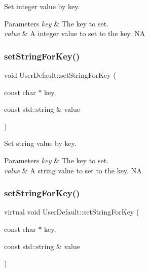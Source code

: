 Set integer value by key. 
\begin{DoxyParams}{Parameters}
{\em key} & The key to set. \\
\hline
{\em value} & A integer value to set to the key.  NA \\
\hline
\end{DoxyParams}
\mbox{\label{classUserDefault_ab2024c825a63e8c78f49b0b2f5b66f37}} 
\subsubsection{\texorpdfstring{set\+String\+For\+Key()}{setStringForKey()}\hspace{0.1cm}{\footnotesize\ttfamily [1/2]}}
{\footnotesize\ttfamily void User\+Default\+::set\+String\+For\+Key (\begin{DoxyParamCaption}\item[{const char $\ast$}]{key,  }\item[{const std\+::string \&}]{value }\end{DoxyParamCaption})\hspace{0.3cm}{\ttfamily [virtual]}}

Set string value by key. 
\begin{DoxyParams}{Parameters}
{\em key} & The key to set. \\
\hline
{\em value} & A string value to set to the key.  NA \\
\hline
\end{DoxyParams}
\mbox{\label{classUserDefault_a2d14d97149a1eb66f03b143d01f8c9b5}} 
\subsubsection{\texorpdfstring{set\+String\+For\+Key()}{setStringForKey()}\hspace{0.1cm}{\footnotesize\ttfamily [2/2]}}
{\footnotesize\ttfamily virtual void User\+Default\+::set\+String\+For\+Key (\begin{DoxyParamCaption}\item[{const char $\ast$}]{key,  }\item[{const std\+::string \&}]{value }\end{DoxyParamCaption})\hspace{0.3cm}{\ttfamily [virtual]}}

